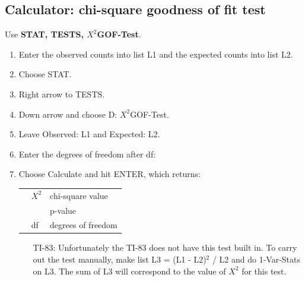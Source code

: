 \subsection{Calculator: chi-square goodness of fit test\vspace{-3mm}}

\begin{termBox}{
Use \textbf{STAT, TESTS, $X^2$GOF-Test}.
\begin{enumerate}
\setlength{\itemsep}{0mm}
\item Enter the observed counts into list L1 and the expected counts into list L2.
\item Choose STAT.
\item Right arrow to TESTS.
\item Down arrow and choose D: $X^2$GOF-Test.
\item Leave Observed: L1 and Expected: L2.
\item Enter the degrees of freedom after df:
\item Choose Calculate and hit ENTER, which returns: \\
\begin{tabular}{l ll}
\hspace{3mm}&
	$X^2$
	&\quad chi-square value \\
&
	\text{p}
	&\quad p-value \\
&
	df
	&\quad  degrees of freedom
\end{tabular}
\begin{itemize}
\item[TI-83: ] Unfortunately the TI-83 does not have this test built in. To carry out the test manually, make list L3 = (L1 - L2)$^2$ / L2 and do 1-Var-Stats on L3. The sum of L3 will correspond to the value of $X^2$ for this test.
\end{itemize}
\end{enumerate}
}
\end{termBox}

